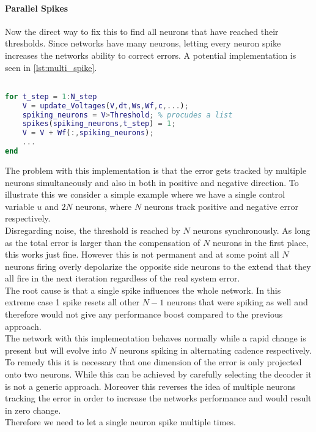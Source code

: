 \paragraph{Parallel Spikes}
Now the direct way to fix this to find all neurons that have reached their thresholds. Since networks have many neurons, letting every neuron spike increases the networks ability to correct errors. A potential implementation is seen in \cref{lst:multi_spike}.
\begin{lstlisting}[language=Matlab, caption=Letting every neuron spike in parallel,label=lst:multi_spike]

for t_step = 1:N_step
	V = update_Voltages(V,dt,Ws,Wf,c,...);
	spiking_neurons = V>Threshold; % procudes a list
	spikes(spiking_neurons,t_step) = 1;
	V = V + Wf(:,spiking_neurons);
	...
end
\end{lstlisting}
The problem with this implementation is that the error gets tracked by multiple neurons simultaneously and also in both in positive and negative direction. To illustrate this we consider a simple example where we have a single control variable $u$ and $2N$ neurons, where $N$ neurons track positive and negative error respectively.\\
Disregarding noise, the threshold is reached by $N$ neurons synchronously. As long as the total error is larger than the compensation of $N$ neurons in the first place, this works just fine. However this is not permanent and at some point all $N$ neurons firing overly depolarize the opposite side neurons to the extend that they all fire in the next iteration regardless of the real system error.\\
The root cause is that a single spike influences the whole network. In this extreme case 1 spike resets all other $N-1$ neurons that were spiking as well and therefore would not give any performance boost compared to the previous approach.\\
The network with this implementation behaves normally while a rapid change is present but will evolve into $N$ neurons spiking in alternating cadence respectively.\\
To remedy this it is necessary that one dimension of the error is only projected onto two neurons. While this can be achieved by carefully selecting the decoder it is not a generic approach. Moreover this reverses the idea of multiple neurons tracking the error in order to increase the networks performance and would result in zero change.\\
Therefore we need to let a single neuron spike multiple times.

